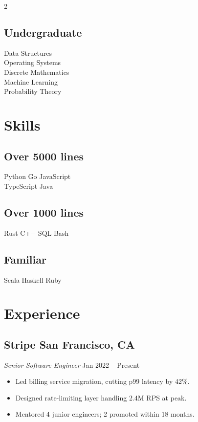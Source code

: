 \documentclass[10pt,letterpaper]{article}
\begin{document}
\begin{paracol}{2}
\subsection*{Undergraduate}
Data Structures \\
Operating Systems \\
Discrete Mathematics \\
Machine Learning \\
Probability Theory

\vspace{4pt}
\section*{Skills}
\subsection*{Over 5000 lines}
Python \textbullet{} Go \textbullet{} JavaScript \\
TypeScript \textbullet{} Java

\subsection*{Over 1000 lines}
Rust \textbullet{} C++ \textbullet{} SQL \textbullet{} Bash

\subsection*{Familiar}
Scala \textbullet{} Haskell \textbullet{} Ruby

\switchcolumn

\section*{Experience}
\subsection*{Stripe \hfill \normalfont\footnotesize San Francisco, CA}
\textit{Senior Software Engineer} \hfill {\footnotesize Jan 2022 -- Present}
\begin{itemize}[leftmargin=*,itemsep=1pt,topsep=2pt]
  \item Led billing service migration, cutting p99 latency by 42\%.
  \item Designed rate-limiting layer handling 2.4M RPS at peak.
  \item Mentored 4 junior engineers; 2 promoted within 18 months.
\end{itemize}


\end{paracol}
\end{document}
